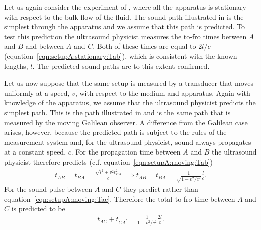 Let us again consider the experiment of ,
where all the apparatus is stationary with respect to the bulk flow of the fluid.
The sound path illustrated in   is the simplest through the apparatus and we assume
that this path is predicted.
%
To test this prediction the ultrasound  physicist measures the to-fro times between $A$ and $B$ and between
$A$ and  $C$.
Both of these times  are equal to $2l/c$ (equation~\ref{eqn:setupA:stationary:Tab}),
which is  consistent with the known lengths, $l$.
The predicted sound paths are to this extent confirmed.


Let us now suppose that the  same setup is measured by a transducer that moves uniformly at a speed, $v$, with respect to the medium and apparatus.
Again with knowledge of the apparatus, we assume that the ultrasound physicist  predicts the simplest path.
This is the path illustrated in  and is the same path that is measured by the  moving Galilean observer.
%
%
A difference from the Galilean case arises,
however,
because the predicted path is subject to the rules of the measurement system
and, for the ultrasound physicist,  sound always propagates at a  constant speed, $c$.
For the propagation time between $A$ and $B$ the ultrasound physicist therefore predicts (c.f. equation~\ref{eqn:setupA:moving:Tab})
\begin{align}
  \label{eqn:setupA:moving:Tab:acoustic}
  t_{AB} = t_{BA} =  \frac{\sqrt{l^2+v^2t_{BA}^2}}{c} \implies t_{AB} =  t_{BA} =\frac{1}{\sqrt{1-v^2/c^2}} \frac{l}{c}.
\end{align}
For the sound pulse between $A$ and $C$  they  predict
rather than  equation~\ref{eqn:setupA:moving:Tac}.
Therefore the total to-fro time between $A$ and $C$  is   predicted   to be
\begin{align}
\label{eqn:setupA:moving:Tac:acoustic}
t_{AC}+t_{CA^\prime} = \frac{1}{{1-v^2/c^2}} \frac{2l}{c}.
\end{align}

